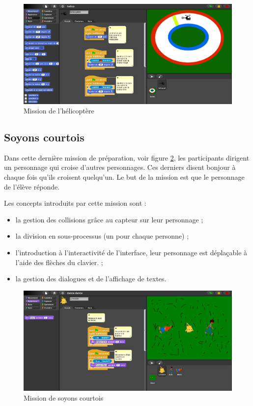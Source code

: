 \begin{figure}
  \begin{center}
    \includegraphics[width=\textwidth]{content/7-solution/1-missions/images/helicoptere}
    \caption{Mission de l'hélicoptère}
    \label{fig:mission-hélicoptère}
  \end{center}
\end{figure}

\subsection{Soyons courtois}
\label{mission-courtois}
Dans cette dernière \gls{mission} de préparation, voir figure \ref{fig:courtois}, les participants dirigent un personnage qui croise d'autres personnages. Ces derniers disent bonjour à chaque fois qu'ils croisent quelqu'un. Le but de la \gls{mission} est que le personnage de l'élève réponde.

Les concepts introduits par cette \gls{mission} sont :
\begin{itemize}
\item la gestion des collisions grâce au capteur sur leur personnage ;
\item la division en sous-processus (un pour chaque personne) ;
\item l'introduction à l'interactivité de l'interface, leur personnage est déplaçable à l'aide des flèches du clavier. ;
\item la gestion des dialogues et de l'affichage de textes.
\end{itemize}

\begin{figure}
  \begin{center}
    \includegraphics[width=\textwidth]{content/7-solution/1-missions/images/courtois}
    \caption{Mission de soyons courtois}
    \label{fig:courtois}
  \end{center}
\end{figure}

